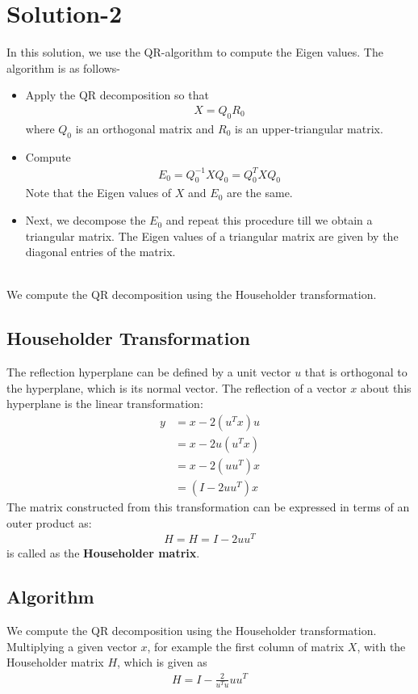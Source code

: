 \documentclass[journal,12pt,twocolumn]{IEEEtran}
\begin{document}
\section{\textbf{Solution-2}}
In this solution, we use the QR-algorithm to compute the Eigen values. The algorithm is as follows-
\begin{itemize}
    \item Apply the QR decomposition so that
            \begin{align*}
                X = Q_0R_0
            \end{align*}
            where $Q_0$ is an orthogonal matrix and $R_0$ is an upper-triangular matrix.
    \item Compute 
          \begin{align*}
                E_0 = Q_0^{-1} X Q_0 = Q_0 ^ T X Q_0
            \end{align*} 
            Note that the Eigen values of $X$ and $E_0$ are the same.
    \item Next, we decompose the $E_0$ and repeat this procedure till we obtain a triangular matrix. The Eigen values of a triangular matrix are given by the diagonal entries of the matrix.
\end{itemize}

\\
We compute the QR decomposition using the Householder transformation.
\subsection{Householder Transformation}
The reflection hyperplane can be defined by a unit vector $u$ that is orthogonal to the hyperplane, which is its normal vector. The reflection of a vector $x$ about this hyperplane is the linear transformation:
    \begin{align*}
        y &= x - 2 (u^T x) u \\
        &= x - 2 u (u ^T x) \\
        &= x - 2 (u u ^T) x \\
        &= (I - 2 u u^T) x
    \end{align*}
    The matrix constructed from this transformation can be expressed in terms of an outer product as:
    \begin{align*}
        H = H=I-2 u u^{T}
    \end{align*}
    is called as the \textbf{Householder matrix}.

\subsection{Algorithm}
We compute the QR decomposition using the Householder transformation.
    Multiplying a given vector $x$, for example the first column of matrix $X$, with the Householder matrix $H$, which is given as
    \begin{align*}
        H=I-\frac{2}{u^{T} u} u u^{T}
    \end{align*}
    
\end{document}
